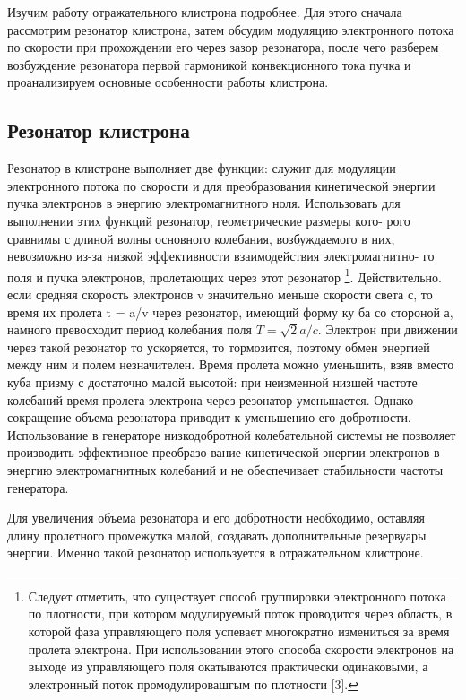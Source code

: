Изучим работу отражательного клистрона подробнее. Для этого сначала
рассмотрим резонатор клистрона, затем обсудим модуляцию электронного
потока по скорости при прохождении его через зазор резонатора, после чего
разберем возбуждение резонатора первой гармоникой конвекционного тока
пучка и проанализируем основные особенности работы клистрона.


\subsection{Резонатор клистрона}

Резонатор в клистроне выполняет две функции: служит для модуляции
электронного потока по скорости и для преобразования кинетической энер­гии пучка электронов в энергию электромагнитного ноля. Использовать
для выполнении этих функций резонатор, геометрические размеры кото-
рого сравнимы с длиной волны основного колебания, возбуждаемого в них,
невозможно из-за низкой эффективности взаимодействия электромагнитно-
го поля и пучка электронов, пролетающих через этот резонатор
\footnote{Следует отметить, что существует способ группировки электронного потока по плотности,
при котором модулируемый поток проводится через область, в которой фаза управляющего поля
успевает многократно измениться за время пролета электрона. При использовании этого способа скорости электронов на выходе из управляющего поля окатываются практически одинаковыми,
а электронный поток промодулировашгым по плотности [3].}. Действи­тельно. если средняя скорость электронов v значительно меньше скорости
света с, то время их пролета t = a/v через резонатор, имеющий форму ку­
ба со стороной а, намного превосходит период колебания поля $T = \sqrt { 2 } a / c$.
Электрон при движении через такой резонатор то ускоряется, то тормозится,
поэтому обмен энергией между ним и полем незначителен. Время пролета
можно уменьшить, взяв вместо куба призму с достаточно малой высотой:
при неизменной низшей частоте колебаний время пролета электрона через
резонатор уменьшается. Однако сокращение объема резонатора приводит к
уменьшению его добротности. Использование в генераторе низкодобротной
колебательной системы не позволяет производить эффективное преобразо­
вание кинетической энергии электронов в энергию электромагнитных коле­баний и не обеспечивает стабильности частоты генератора.

Для увеличения объема резонатора и его добротности необходимо, остав­ляя длину пролетного промежутка малой, создавать дополнительные резервуары энергии. Именно такой резонатор используется в отражательном
клистроне.

